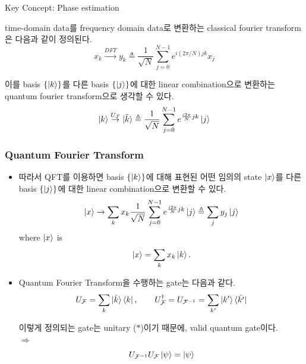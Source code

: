 \documentclass[9pt]{beamer}
\begin{document}
\begin{section}{Key Concept: Phase estimation}
\begin{frame}
            \vspace{0.2cm}
            \begin{theorem}
                time-domain data를 frequency domain data로 변환하는 classical fourier transform은 다음과 같이 정의된다.
                $$ x_k \overset{DFT}{\rightarrow} y_k \triangleq \frac{1}{\sqrt N} \sum^{N-1}_{j=0} e^{{i(2\pi/N)} jk}x_j$$
            \end{theorem}
            \vspace{0.2cm}
            \begin{theorem}
                이를 basis $\{\ket k\}$를 다른 basis $\{\ket j\}$에 대한 linear combination으로 변환하는 quantum fourier transform으로 생각할 수 있다.
            $$\ket k \overset{U_{\mathcal F}}{\rightarrow}  \ket{\tilde k}  \triangleq \frac{1}{\sqrt N} \sum^{N-1}_{j=0} e^{\frac{i2\pi}{N} jk} \ket j $$
            \end{theorem}\label{thr:qft}
            
        \end{frame}

        \begin{frame}
            \frametitle{Quantum Fourier Transform}
            \begin{itemize}
                \item 따라서 QFT를 이용하면 basis $\{\ket k\}$에 대해 표현된 어떤 임의의 state $\ket x$를 다른 basis $\{\ket j\}$에 대한 linear combination으로 변환할 수 있다.
                $$\ket x \rightarrow \sum_k x_k \frac{1}{\sqrt N} \sum^{N-1}_{j=0} e^{\frac{i2\pi}{N} jk} \ket j \triangleq  \sum_j y_j \ket j $$
                where $\ket x$ is
                $$\ket x = \sum_k x_k \ket{k}.$$
                \item Quantum Fourier Transform을 수행하는 gate는 다음과 같다.
                $$U_\mathcal F = \sum_k \ket{\tilde k} \bra{k}, \qquad U_{\mathcal F}^\dagger = U_{\mathcal F^{-1}}= \sum_{k'} \ket{ {k'}} \bra{\tilde {k'}}$$

                이렇게 정의되는 gate는 unitary ($\ast$)이기 때문에, valid quantum gate이다. 
                \\$\Rightarrow$
                \vspace{1cm}
                $$ U_{\mathcal F^{-1}}U_{\mathcal F} \ket{\psi} = \ket{\psi}$$
            \end{itemize}
        \end{frame}


\end{section}
\end{document}
